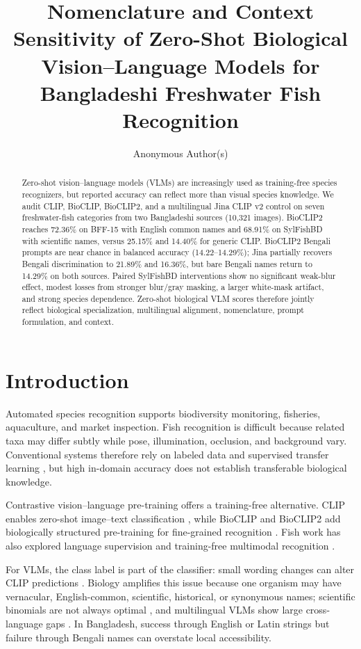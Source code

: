 \documentclass{article}
\title{Nomenclature and Context Sensitivity of Zero-Shot Biological Vision--Language Models for Bangladeshi Freshwater Fish Recognition}
\author{Anonymous Author(s)}
\begin{document}
\maketitle

\begin{abstract}
Zero-shot vision--language models (VLMs) are increasingly used as training-free species recognizers, but reported accuracy can reflect more than visual species knowledge. We audit CLIP, BioCLIP, BioCLIP2, and a multilingual Jina CLIP v2 control on seven freshwater-fish categories from two Bangladeshi sources (10,321 images). BioCLIP2 reaches 72.36\% on BFF-15 with English common names and 68.91\% on SylFishBD with scientific names, versus 25.15\% and 14.40\% for generic CLIP. BioCLIP2 Bengali prompts are near chance in balanced accuracy (14.22--14.29\%); Jina partially recovers Bengali discrimination to 21.89\% and 16.36\%, but bare Bengali names return to 14.29\% on both sources. Paired SylFishBD interventions show no significant weak-blur effect, modest losses from stronger blur/gray masking, a larger white-mask artifact, and strong species dependence. Zero-shot biological VLM scores therefore jointly reflect biological specialization, multilingual alignment, nomenclature, prompt formulation, and context.
\end{abstract}

\section{Introduction}
Automated species recognition supports biodiversity monitoring, fisheries, aquaculture, and market inspection. Fish recognition is difficult because related taxa may differ subtly while pose, illumination, occlusion, and background vary. Conventional systems therefore rely on labeled data and supervised transfer learning \citep{shah2019fishpak,xu2021seresnet,das2024bdfreshwater}, but high in-domain accuracy does not establish transferable biological knowledge.

Contrastive vision--language pre-training offers a training-free alternative. CLIP enables zero-shot image--text classification \citep{radford2021clip}, while BioCLIP and BioCLIP2 add biologically structured pre-training for fine-grained recognition \citep{stevens2024bioclip,gu2025bioclip2}. Fish work has also explored language supervision and training-free multimodal recognition \citep{dai2024clipfssc,jose2026zeroshot}.

For VLMs, the class label is part of the classifier: small wording changes can alter CLIP predictions \citep{zhou2022coop,zhou2022cocoop}. Biology amplifies this issue because one organism may have vernacular, English-common, scientific, historical, or synonymous names; scientific binomials are not always optimal \citep{parashar2023scientific}, and multilingual VLMs show large cross-language gaps \citep{geigle2024babel,chung2026uclip}. In Bangladesh, success through English or Latin strings but failure through Bengali names can overstate local accessibility.
\end{document}
